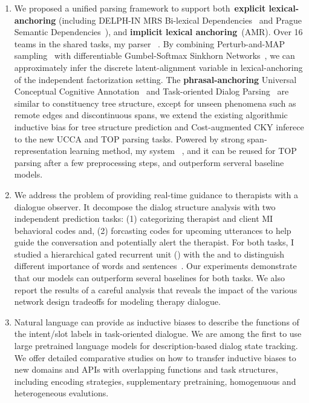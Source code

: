 \begin{enumerate}
\item We proposed a unified parsing framework to support
  both~\textbf{explicit lexical-anchoring} (including DELPH-IN MRS
  Bi-lexical Dependencies~\citep[DM,][]{ivanova2012did} and Prague
  Semantic
  Dependencies~\citep[PSD,][]{hajic2012announcing,miyao2014house}),
  and \textbf{implicit lexical anchoring}~(AMR). Over 16 teams in the
  shared tasks, my parser~\citep{cao2019amazon} . By combining Perturb-and-MAP
  sampling~\citep{papandreouperturb} with differentiable
  Gumbel-Softmax Sinkhorn Networks~\citep{mena2018learning}, we can
  approximately infer the discrete latent-alignment variable in
  lexical-anchoring of the independent factorization setting. The
  \textbf{phrasal-anchoring} Universal Conceptual Cognitive
  Annotation~\citep[UCCA,][]{abend2013universal} and Task-oriented
  Dialog Parsing~\citep[TOP,][]{gupta-etal-2018-semantic-parsing} are
  similar to constituency tree structure, except for unseen phenomena
  such as remote edges and discontinuous spans, we extend the existing
  algorithmic inductive bias for tree structure prediction and
  Cost-augmented CKY inferece to the new UCCA and TOP parsing
  tasks. Powered by strong span-representation learning method, my
  system~\citep{cao2019amazon} , and
  it can be reused for TOP parsing after a few preprocessing steps,
  and outperform serveral baseline models.

\item We address the problem of providing real-time guidance to
  therapists with a dialogue observer. It decompose the dialog
  structure analysis with two independent prediction tasks: (1)
  categorizing therapist and client MI behavioral codes and, (2)
  forcasting codes for upcoming utterances to help guide the
  conversation and potentially alert the therapist. For both tasks, I
  studied a hierarchical gated recurrent unit (\HGRU) with the
   and  to
  distinguish different importance of words and
  sentences~\citep{jie2019psycdialacl}. Our experiments demonstrate
  that our models can outperform several baselines for both tasks.  We
  also report the results of a careful analysis that reveals the
  impact of the various network design tradeoffs for modeling therapy
  dialogue.

\item Natural language can provide as inductive biases to describe the
  functions of the intent/slot labels in task-oriented dialogue. We
  are among the first to use large pretrained language models for
  description-based dialog state tracking. We offer detailed
  comparative studies on how to transfer inductive biases to new
  domains and APIs with overlapping functions and task structures,
  including encoding strategies, supplementary pretraining,
  homogenuous and heterogeneous evalutions.
\end{enumerate}


